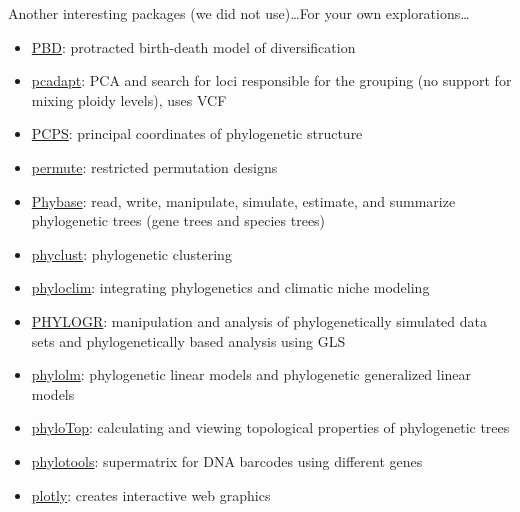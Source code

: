 \documentclass[compress, xelatex, 11pt, xcolor=svgnames, aspectratio=169,
	hyperref={
		bookmarks=true,
		unicode=true,
		colorlinks=true,
		pdftitle={Molecular data in R},
		plainpages=false,
		pdfauthor={Vojtech Zeisek},
		pdfsubject={Course about phylogeny and evolution in R},
		pdfcreator={XeLaTeX},
		pdfkeywords={R, evolution, phylogeny, molecular data},
		linkcolor=Crimson, %
		anchorcolor=Magenta, %
		citecolor=Magenta, %
		filecolor=Magenta, %
		menucolor=Magenta, %
		urlcolor=DodgerBlue, %
		},
	url={hyphens, lowtilde} %
	]{beamer}
\begin{document}
\begin{frame}[allowframebreaks]{Another interesting packages (we did not use)\ldots}{For your own explorations\ldots}
\begin{itemize}
		\item \href{https://CRAN.R-project.org/package=PBD}{PBD}: protracted birth-death model of diversification
		\item \href{https://CRAN.R-project.org/package=pcadapt}{pcadapt}: PCA and search for loci responsible for the grouping (no support for mixing ploidy levels), uses VCF
		\item \href{https://CRAN.R-project.org/package=PCPS}{PCPS}: principal coordinates of phylogenetic structure
		\item \href{https://CRAN.R-project.org/package=permute}{permute}: restricted permutation designs
		\item \href{https://github.com/lliu1871/phybase}{Phybase}: read, write, manipulate, simulate, estimate, and summarize phylogenetic trees (gene trees and species trees)
		\item \href{https://CRAN.R-project.org/package=phyclust}{phyclust}: phylogenetic clustering
		\item \href{https://CRAN.R-project.org/package=phyloclim}{phyloclim}: integrating phylogenetics and climatic niche modeling
		\item \href{https://CRAN.R-project.org/package=PHYLOGR}{PHYLOGR}: manipulation and analysis of phylogenetically simulated data sets and phylogenetically based analysis using GLS
		\item \href{https://CRAN.R-project.org/package=phylolm}{phylolm}: phylogenetic linear models and phylogenetic generalized linear models
		\item \href{https://CRAN.R-project.org/package=phyloTop}{phyloTop}: calculating and viewing topological properties of phylogenetic trees
		\item \href{https://CRAN.R-project.org/package=phylotools}{phylotools}: supermatrix for DNA barcodes using different genes
		\item \href{https://CRAN.R-project.org/package=plotly}{plotly}: creates interactive web graphics

\end{itemize}
\end{frame}
\end{document}
